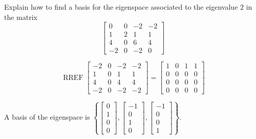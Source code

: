 
\begin{exerciseStatement}


Explain how to find a basis for the eigenspace associated to the eigenvalue \( 2 \) in the matrix \[ \left[\begin{array}{cccc}
0 & 0 & -2 & -2 \\
1 & 2 & 1 & 1 \\
4 & 0 & 6 & 4 \\
-2 & 0 & -2 & 0
\end{array}\right] \]


\end{exerciseStatement}
    
\begin{exerciseAnswer} 


\[\operatorname{RREF} \left[\begin{array}{cccc}
-2 & 0 & -2 & -2 \\
1 & 0 & 1 & 1 \\
4 & 0 & 4 & 4 \\
-2 & 0 & -2 & -2
\end{array}\right] = \left[\begin{array}{cccc}
1 & 0 & 1 & 1 \\
0 & 0 & 0 & 0 \\
0 & 0 & 0 & 0 \\
0 & 0 & 0 & 0
\end{array}\right] \]



A basis of the eigenspace is \( \left\{ \left[\begin{array}{c}
0 \\
1 \\
0 \\
0
\end{array}\right] , \left[\begin{array}{c}
-1 \\
0 \\
1 \\
0
\end{array}\right] , \left[\begin{array}{c}
-1 \\
0 \\
0 \\
1
\end{array}\right] \right\} \).


\end{exerciseAnswer}
    
